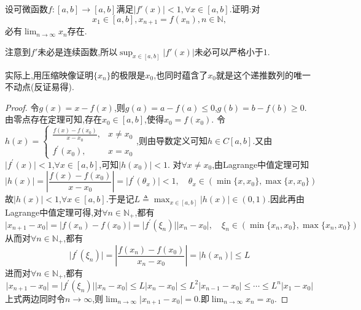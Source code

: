 \documentclass[../../main.tex]{subfiles}
\begin{document}
\begin{proposition}[加强的压缩映像]\label{proposition:加强的压缩映像}
设可微函数\(f:[a,b]\to[a,b]\)满足\(\vert f'(x)\vert<1,\forall x\in[a,b]\).证明:对
\[
x_1\in[a,b],x_{n + 1} = f(x_n),n\in\mathbb{N},
\]
必有\(\lim_{n \to \infty} x_n\)存在.  
\end{proposition}
\begin{remark}
注意到\(f'\)未必是连续函数,所以\(\sup_{x\in[a,b]}\vert f'(x)\vert\)未必可以严格小于\(1\).
\end{remark}
\begin{note}
实际上,用压缩映像证明$\{x_n\}$的极限是$x_0$,也同时蕴含了$x_0$就是这个递推数列的唯一不动点(反证易得).
\end{note}
\begin{proof}
令\(g(x)=x - f(x)\),则\(g(a)=a - f(a)\leqslant0\),\(g(b)=b - f(b)\geqslant0\).由零点存在定理可知,存在\(x_0\in[a,b]\),使得\(x_0 = f(x_0)\).
令\(h(x)=\begin{cases}
\frac{f(x) - f(x_0)}{x - x_0},&x\neq x_0\\
f^\prime(x_0),&x = x_0
\end{cases}\),则由导数定义可知\(h\in C[a,b]\).又由\(\vert f^\prime(x)\vert<1\),\(\forall x\in[a,b]\),可知\(\vert h(x_0)\vert<1\).
对\(\forall x\neq x_0\),由Lagrange中值定理可知
\[
\vert h(x)\vert=\left\vert\frac{f(x) - f(x_0)}{x - x_0}\right\vert=\vert f^\prime(\theta_x)\vert<1,\quad\theta_x\in(\min\{x,x_0\},\max\{x,x_0\})
\]
故\(\vert h(x)\vert<1\),\(\forall x\in[a,b]\).于是记\(L\triangleq\max_{x\in[a,b]}\vert h(x)\vert\in(0,1)\).因此再由Lagrange中值定理可得,对\(\forall n\in\mathbb{N}_+\),都有
\[
\vert x_{n + 1}-x_0\vert=\vert f(x_n) - f(x_0)\vert=\vert f^\prime(\xi_n)\vert\vert x_n - x_0\vert,\quad\xi_n\in(\min\{x_n,x_0\},\max\{x_n,x_0\})
\]
从而对\(\forall n\in\mathbb{N}_+\),都有
\[
\vert f^\prime(\xi_n)\vert=\left\vert\frac{f(x_n) - f(x_0)}{x_n - x_0}\right\vert=\vert h(x_n)\vert\leqslant L
\]
进而对\(\forall n\in\mathbb{N}_+\),都有
\[
\vert x_{n + 1}-x_0\vert=\vert f^\prime(\xi_n)\vert\vert x_n - x_0\vert\leqslant L\vert x_n - x_0\vert\leqslant L^2\vert x_{n - 1}-x_0\vert\leqslant\cdots\leqslant L^n\vert x_1 - x_0\vert
\]
上式两边同时令\(n\rightarrow\infty\),则\(\lim_{n\rightarrow\infty}\vert x_{n + 1}-x_0\vert = 0\).即\(\lim_{n\rightarrow\infty}x_n = x_0\).
\end{proof}
\end{document}
